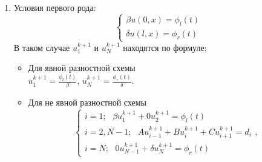 \documentclass[12pt]{article}
\begin{document}
\begin{enumerate}
    \begin{enumerate}
        \item Условия первого рода:
            \begin{equation*}
                \begin{cases}
                    \beta u(0,x) = \phi_l(t)
                    \\
                    \delta u(l,x) = \phi_r(t)
                \end{cases}
            \end{equation*}
            В таком случае $u_1^{k+1}$ и $u_N^{k+1}$ находятся по формуле:
            \begin{itemize}
                \item Для явной разностной схемы\\
                $u_1^{k+1}=\frac{\phi_l(t)}{\beta}$, $u_N^{k+1}=\frac{\phi_r(t)}{\delta}$.
                \item Для не явной разностной схемы\\
                \begin{equation*}
                    \begin{cases}
                        i=1;\:\:\: \beta u_1^{k+1} +0u_{2}^{k+1}=\phi_l(t)
                        \\
                        i=\overline{2,N-1};\:\:\:Au_{i-1}^{k+1} + Bu_i^{k+1} +Cu_{i+1}^{k+1}=d_i
                        \\
                        i=N;\:\:\: 0u_{N-1}^{k+1} + \delta u_N^{k+1} = \phi_r(t)
                    \end{cases},
                \end{equation*}
            \end{itemize}


\end{enumerate}
\end{enumerate}
\end{document}
